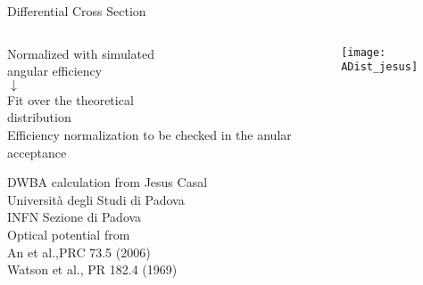 \begin{frame}{Differential Cross Section}
    	\vspace{-0.05\textheight}
    \begin{overlayarea}{\textwidth}{0.1\textheight}
	\centering
	\end{overlayarea}	
	\vspace{-0.08\textheight}
	\begin{columns}
		\begin{column}{0.4\textwidth}
			\begin{overlayarea}{\textwidth}{\textheight}
				\centering
				Normalized with simulated\\ angular efficiency\\
				$\downarrow$\\
				Fit over the theoretical\\ distribution\\
				\vspace{0.05\textheight}
				Efficiency normalization to be checked in the anular acceptance\\
				\vspace{0.05\textheight}

				\tiny DWBA calculation from Jesus Casal\\
				Università degli Studi di Padova\\
				INFN Sezione di Padova\\				
				\vspace{0.02\textheight}
				Optical potential from\\ An et al.,PRC 73.5 (2006)\\
				Watson et al., PR 182.4 (1969)\\
				 
			\end{overlayarea}
		\end{column}
		\begin{column}{0.6\textwidth}
			\begin{overlayarea}{\textwidth}{\textheight}
				\centering      
				\texttt{[image: ADist\_jesus]}			 				
		    \end{overlayarea}	
		\end{column}
	\end{columns}
\end{frame}


